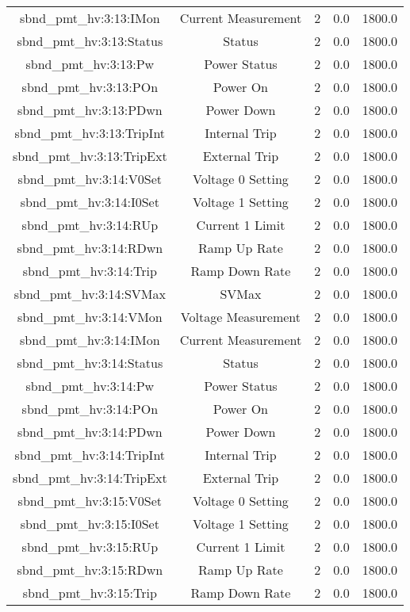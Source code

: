\begin{table}[ptb]
\begin{tabular}{c | c c c c}
sbnd_pmt_hv:3:13:IMon & Current Measurement & 2 & 0.0 & 1800.0\\ 
sbnd_pmt_hv:3:13:Status & Status & 2 & 0.0 & 1800.0\\ 
sbnd_pmt_hv:3:13:Pw & Power Status & 2 & 0.0 & 1800.0\\ 
sbnd_pmt_hv:3:13:POn & Power On & 2 & 0.0 & 1800.0\\ 
sbnd_pmt_hv:3:13:PDwn & Power Down & 2 & 0.0 & 1800.0\\ 
sbnd_pmt_hv:3:13:TripInt & Internal Trip & 2 & 0.0 & 1800.0\\ 
sbnd_pmt_hv:3:13:TripExt & External Trip & 2 & 0.0 & 1800.0\\ 
sbnd_pmt_hv:3:14:V0Set & Voltage 0 Setting & 2 & 0.0 & 1800.0\\ 
sbnd_pmt_hv:3:14:I0Set & Voltage 1 Setting & 2 & 0.0 & 1800.0\\ 
sbnd_pmt_hv:3:14:RUp & Current 1 Limit & 2 & 0.0 & 1800.0\\ 
sbnd_pmt_hv:3:14:RDwn & Ramp Up Rate & 2 & 0.0 & 1800.0\\ 
sbnd_pmt_hv:3:14:Trip & Ramp Down Rate & 2 & 0.0 & 1800.0\\ 
sbnd_pmt_hv:3:14:SVMax & SVMax & 2 & 0.0 & 1800.0\\ 
sbnd_pmt_hv:3:14:VMon & Voltage Measurement & 2 & 0.0 & 1800.0\\ 
sbnd_pmt_hv:3:14:IMon & Current Measurement & 2 & 0.0 & 1800.0\\ 
sbnd_pmt_hv:3:14:Status & Status & 2 & 0.0 & 1800.0\\ 
sbnd_pmt_hv:3:14:Pw & Power Status & 2 & 0.0 & 1800.0\\ 
sbnd_pmt_hv:3:14:POn & Power On & 2 & 0.0 & 1800.0\\ 
sbnd_pmt_hv:3:14:PDwn & Power Down & 2 & 0.0 & 1800.0\\ 
sbnd_pmt_hv:3:14:TripInt & Internal Trip & 2 & 0.0 & 1800.0\\ 
sbnd_pmt_hv:3:14:TripExt & External Trip & 2 & 0.0 & 1800.0\\ 
sbnd_pmt_hv:3:15:V0Set & Voltage 0 Setting & 2 & 0.0 & 1800.0\\ 
sbnd_pmt_hv:3:15:I0Set & Voltage 1 Setting & 2 & 0.0 & 1800.0\\ 
sbnd_pmt_hv:3:15:RUp & Current 1 Limit & 2 & 0.0 & 1800.0\\ 
sbnd_pmt_hv:3:15:RDwn & Ramp Up Rate & 2 & 0.0 & 1800.0\\ 
sbnd_pmt_hv:3:15:Trip & Ramp Down Rate & 2 & 0.0 & 1800.0\\ 

\end{tabular}
\end{table}

